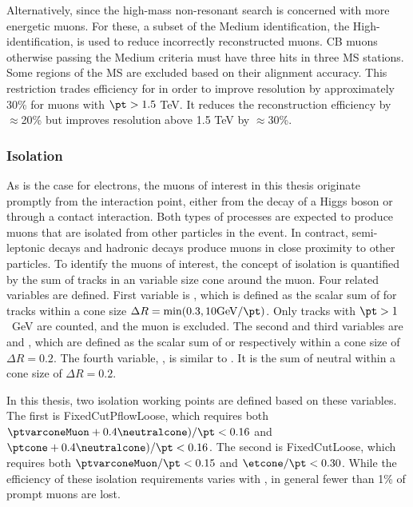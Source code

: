 Alternatively, since the high-mass non-resonant search is concerned with more energetic muons.
For these, a subset of the Medium identification, the High-\pt identification, is used to reduce incorrectly reconstructed muons.
CB muons otherwise passing the Medium criteria must have three hits in three MS stations.
Some regions of the MS are excluded based on their alignment accuracy.
This restriction trades efficiency for in order to improve \pt resolution by approximately 30\% for muons with $\pt>1.5$ TeV.
It reduces the reconstruction efficiency by $\approx$20\% but improves \pt resolution above 1.5 TeV by $\approx$30\%.
\cite{muonReco}

\subsubsection{Isolation}

As is the case for electrons, the muons of interest in this thesis originate promptly from the interaction point, either from the decay of a Higgs boson or through a contact interaction.
Both types of processes are expected to produce muons that are isolated from other particles in the event.
In contract, semi-leptonic decays and hadronic decays produce muons in close proximity to other particles.
To identify the muons of interest, the concept of isolation is quantified by the sum of tracks in an variable size cone around the muon.
Four related variables are defined.
First variable is \ptvarconeMuon, which is defined as the scalar sum of \pt for tracks within a cone size $\Delta R=\text{min}(0.3,10\text{GeV}/\pt)$. Only tracks with $\pt>1$~GeV are counted, and the muon \pt is excluded.
The second and third variables are \etcone and \ptcone, which are defined as the scalar sum of \et or \pt respectively within a cone size of $\Delta R=0.2$.
The fourth variable, \neutralcone, is similar to \etcone. It is the sum of neutral \et within a cone size of $\Delta R=0.2$.

In this thesis, two isolation working points are defined based on these variables.
The first is FixedCutPflowLoose, which requires both $\ptvarconeMuon+0.4\neutralcone)/\pt<0.16$ and $\ptcone+0.4\neutralcone)/\pt<0.16$.
The second is FixedCutLoose, which requires both $\ptvarconeMuon/\pt<0.15$ and $\etcone/\pt<0.30$.
While the efficiency of these isolation requirements varies with \pt, in general fewer than 1\% of prompt muons are lost.
\cite{muonReco}

